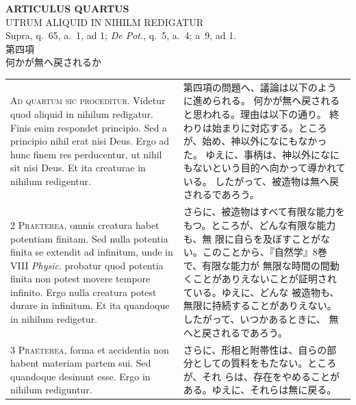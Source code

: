 \documentclass[paper=a4paper,fontsize=10pt,jafontsize=9pt,titlepage]{jlreq}
\begin{document}
\begin{center}
 {\Large {\bfseries ARTICULUS QUARTUS}}\\
 {\large UTRUM ALIQUID IN NIHILM REDIGATUR}\\
 {\footnotesize Supra, q.~65, a.~1, ad 1; {\itshape De Pot.}, q.~5,
 a.~4; a~9, ad 1.}\\
 {\Large 第四項\\何かが無へ戻されるか}
\end{center}

\begin{longtable}{p{21em}p{21em}}


{\huge A}{\scshape d quartum sic proceditur}. Videtur quod
aliquid in nihilum redigatur. Finis enim respondet principio. Sed a
principio nihil erat nisi Deus. Ergo ad hunc finem res perducentur, ut
nihil sit nisi Deus. Et ita creaturae in nihilum redigentur.

&

第四項の問題へ、議論は以下のように進められる。
何かが無へ戻されると思われる。理由は以下の通り。
終わりは始まりに対応する。ところが、始め、神以外になにもなかった。
ゆえに、事柄は、神以外になにもないという目的へ向かって導かれている。
したがって、被造物は無へ戻されるであろう。

\\


{\scshape 2 Praeterea}, omnis creatura habet potentiam
finitam. Sed nulla potentia finita se extendit ad infinitum, unde in
VIII {\itshape Physic}. probatur quod potentia finita non potest movere tempore
infinito. Ergo nulla creatura potest durare in infinitum. Et ita
quandoque in nihilum redigetur.

&


さらに、被造物はすべて有限な能力をもつ。ところが、どんな有限な能力も、無
 限に自らを及ぼすことがない。このことから、『自然学』8巻で、有限な能力が
 無限な時間の間動くことがありえないことが証明されている。ゆえに、どんな
 被造物も、無限に持続することがありえない。したがって、いつかあるときに、
 無へと戻されるであろう。

\\


{\scshape 3 Praeterea}, forma et accidentia non habent
materiam partem sui. Sed quandoque desinunt esse. Ergo in nihilum
rediguntur.

&

さらに、形相と附帯性は、自らの部分としての質料をもたない。ところが、それ
 らは、存在をやめることがある。ゆえに、それらは無に戻る。


\end{longtable}
\end{document}
